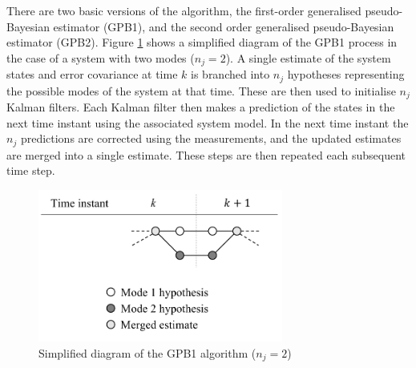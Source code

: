 There are two basic versions of the algorithm, the first-order generalised pseudo-Bayesian estimator (GPB1), and the second order generalised pseudo-Bayesian estimator (GPB2). Figure \ref{fig:mm-obs-gpb1} shows a simplified diagram of the GPB1 process in the case of a system with two modes ($n_j=2$). A single estimate of the system states and error covariance at time $k$ is branched into $n_j$ hypotheses representing the possible modes of the system at that time. These are then used to initialise $n_j$ Kalman filters. Each Kalman filter then makes a prediction of the states in the next time instant using the associated system model. In the next time instant the $n_j$ predictions are corrected using the measurements, and the updated estimates are merged into a single estimate. These steps are then repeated each subsequent time step. 

\begin{figure}[htp]
	\centering
	\includegraphics[height=5cm]{images/mm_obs_seq_gpb1.pdf}
	\caption{Simplified diagram of the GPB1 algorithm ($n_j=2$)}
	\label{fig:mm-obs-gpb1}
\end{figure}


